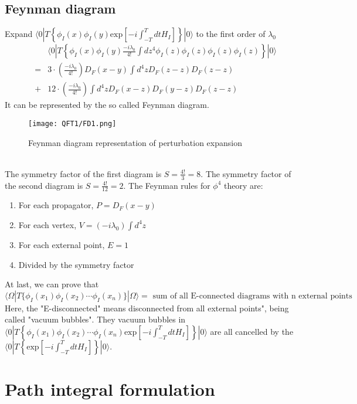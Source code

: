 \subsection{Feynman diagram}
Expand $\langle 0 | T \left\{ \phi_I(x) \phi_I(y) \mathrm{exp} \left[ -i \int_{-T}^{T} dt H_I \right]\right\} | 0 \rangle$ to the first order of $\lambda_0$
\begin{eqnarray}
& &\langle 0 | T \left\{ \phi_I(x) \phi_I(y) \frac{-i\lambda_0}{4!} \int dz^4 \phi_I(z) \phi_I(z) \phi_I(z) \phi_I(z) \right\} | 0 \rangle \nonumber \\
&=& 3 \cdot (\frac{-i\lambda_0}{4!}) D_F(x-y) \int d^4 z D_F(z-z) D_F(z-z) \nonumber \\
&+& 12 \cdot (\frac{-i\lambda_0}{4!}) \int d^4 z  D_F(x-z) D_F(y-z) D_F(z-z) \nonumber
\end{eqnarray}
It can be represented by the so called Feynman diagram.
\begin{figure}[!h]
\centering
\texttt{[image: QFT1/FD1.png]}
\caption{Feynman diagram representation of perturbation expansion}
\end{figure}
\\
The symmetry factor of the first diagram is $S = \frac{4!}{3} = 8$.
The symmetry factor of the second diagram is $S = \frac{4!}{12} = 2$.
The Feynman rules for $\phi^4$ theory are:
\begin{enumerate}
\item For each propagator, $P = D_F(x-y)$
\item For each vertex, $V = (-i\lambda_0)\int d^4z$
\item For each external point, $E=1$
\item Divided by the symmetry factor
\end{enumerate}
At last, we can prove that
\[\langle \Omega | T \{ \phi_I(x_1) \phi_I(x_2) \cdots \phi_I(x_n) \} | \Omega \rangle = \mbox{ sum of all E-connected diagrams with n external points}\]
Here, the "E-disconnected" means disconnected from all external points", being called "vacuum bubbles". They vacuum bubbles in $\langle 0 | T \left\{ \phi_I(x_1) \phi_I(x_2) \cdots \phi_I(x_n) \mathrm{exp} \left[ -i \int_{-T}^{T} dt H_I \right]\right\} | 0 \rangle$ are all cancelled by the $\langle 0 | T \left\{ \mathrm{exp} \left[ -i \int_{-T}^{T} dt H_I \right]\right\} | 0 \rangle$.

\section{Path integral formulation}
